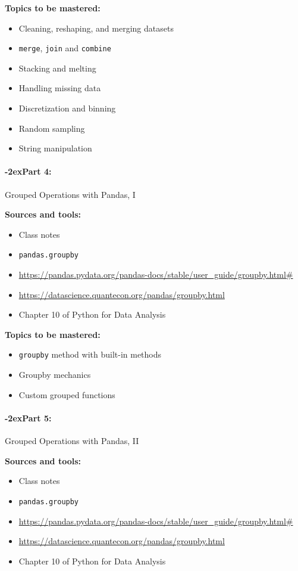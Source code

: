 \documentclass[11pt]{article}
\newcommand{\module}[1]{%
    \paragraph*{\kern-2ex\quad #1:}
  }
\begin{document}
  {\bf Topics to be mastered:}
  \begin{itemize}
    \item Cleaning, reshaping, and merging datasets
    \item \texttt{merge}, \texttt{join} and \texttt{combine}
    \item Stacking and melting
    \item Handling missing data
    \item Discretization and binning
    \item Random sampling
    \item String manipulation
  \end{itemize}

  \module{Part 4} Grouped Operations with Pandas, I

  \bigskip

  {\bf Sources and tools:}
  \begin{itemize}
    \item Class notes
    \item \texttt{pandas.groupby}
    \item \url{https://pandas.pydata.org/pandas-docs/stable/user_guide/groupby.html#}
    \item \url{https://datascience.quantecon.org/pandas/groupby.html}
    \item Chapter 10 of Python for Data Analysis
  \end{itemize}

  {\bf Topics to be mastered:}
  \begin{itemize}
    \item \texttt{groupby} method with built-in methods
    \item Groupby mechanics
    \item Custom grouped functions
  \end{itemize}

  \module{Part 5} Grouped Operations with Pandas, II

  \bigskip

  {\bf Sources and tools:}
  \begin{itemize}
    \item Class notes
    \item \texttt{pandas.groupby}
    \item \url{https://pandas.pydata.org/pandas-docs/stable/user_guide/groupby.html#}
    \item \url{https://datascience.quantecon.org/pandas/groupby.html}
    \item Chapter 10  of Python for Data Analysis
  \end{itemize}
\end{document}
